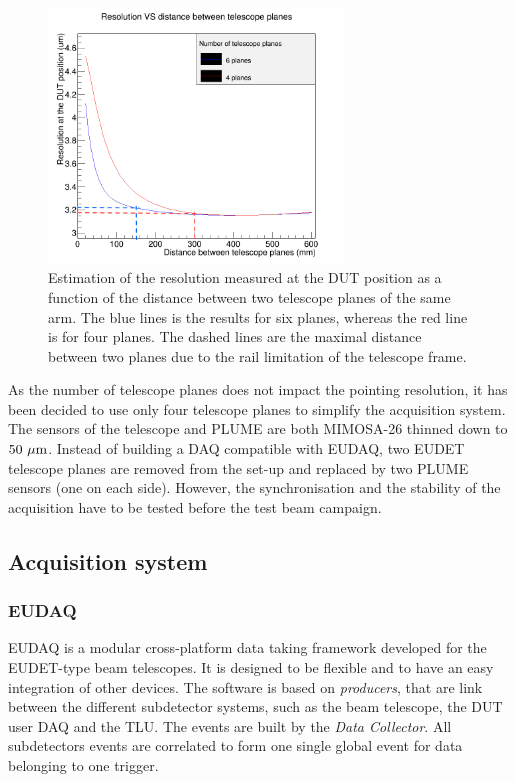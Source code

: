     \begin{figure}[!h]
      \centering
      \includegraphics[width = 0.7\textwidth]{Pictures/X0/resolution_4Vs6planes_4-7GeV.png}
      \caption{Estimation of the resolution measured at the DUT position as a function of the distance between two telescope planes of the same arm.
      The blue lines is the results for six planes, whereas the red line is for four planes. 
      The dashed lines are the maximal distance between two planes due to the rail limitation of the telescope frame.}
      \label{fig:estimationRes4.7GeV}
    \end{figure}

    As the number of telescope planes does not impact the pointing resolution, it has been decided to use only four telescope planes to simplify the acquisition system.
    The sensors of the telescope and \gls{PLUME} are both \gls{MIMOSA}-26 thinned down to $50~\rm{\mu m}$.
    Instead of building a DAQ compatible with EUDAQ, two EUDET telescope planes are removed from the set-up and replaced by two \gls{PLUME} sensors (one on each side).
    However, the synchronisation and the stability of the acquisition have to be tested before the test beam campaign. 

    \subsection{Acquisition system}
      
      \subsubsection{EUDAQ}

      EUDAQ is a modular cross-platform data taking framework developed for the EUDET-type beam telescopes\cite{Jansen}.
      It is designed to be flexible and to have an easy integration of other devices.
      The software is based on \textit{producers}, that are link between the different subdetector systems, such as the beam telescope, the \gls{DUT} user DAQ and the \gls{TLU}.
      The events are built by the \textit{Data Collector}.
      All subdetectors events are correlated to form one single global event for data belonging to one trigger.
      
